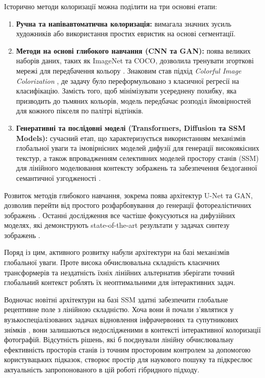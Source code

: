         Історично методи колоризації можна поділити на три основні етапи:
        \begin{enumerate}
            \item \textbf{Ручна та напівавтоматична колоризація:} вимагала значних зусиль художників або використання простих евристик на основі сегментації.
            \item \textbf{Методи на основі глибокого навчання (CNN та GAN):} поява великих наборів даних, таких як ImageNet та COCO, дозволила тренувати згорткові мережі для передбачення кольору \cite{2016-deep-learning}.
                    Знаковим став підхід \textit{Colorful Image Colorization} \cite{2016-colorful-image-colorization}, де задачу було переформульовано з класичної регресії на класифікацію.
                    Замість того, щоб мінімізувати усереднену похибку, яка призводить до тьмяних кольорів, модель передбачає розподіл ймовірностей для кожного пікселя по палітрі відтінків.
            \item \textbf{Генеративні та послідовні моделі (Transformers, Diffusion та SSM Models):} сучасний етап,
            що характеризується використанням механізмів глобальної уваги та імовірнісних моделей дифузії для генерації високоякісних текстур,
            а також впровадженням селективних моделей простору станів (SSM) для лінійного моделювання контексту зображень та забезпечення бездоганної семантичної узгодженості \cite{2023-diffusion-models-survey, 2023-mamba}.
        \end{enumerate}

        Розвиток методів глибокого навчання, зокрема поява архітектур U-Net та GAN, дозволив перейти від простого розфарбовування до генерації фотореалістичних зображень \cite{2017-image-to-image-translation}. 
        Останні дослідження все частіше фокусуються на дифузійних моделях, які демонструють state-of-the-art результати у задачах синтезу зображень \cite{2022-palette-image-to-image-diffusion-models}. 
        
        Поряд із цим, активного розвитку набули архітектури на базі механізмів глобальної уваги. Проте висока обчислювальна складність класичних трансформерів та нездатність їхніх лінійних альтернатив зберігати точний глобальний контекст роблять їх неоптимальними для інтерактивних задач.

        Водночас новітні архітектури на базі SSM здатні забезпечити глобальне рецептивне поле з лінійною складністю.
        Хоча вони й почали з'являтися у вузькоспеціалізованих задачах відновлення інфрачервоних \cite{2024-colormamba, 2026-haqagen} та супутникових знімків \cite{2026-mfmamba}, вони залишаються недослідженими в контексті інтерактивної колоризації фотографій.
        Відсутність рішень, які б поєднували лінійну обчислювальну ефективність просторів станів із точним просторовим контролем за допомогою користувацьких підказок, створює простір для наукового пошуку та підкреслює актуальність запропонованого в цій роботі гібридного підходу.
    
